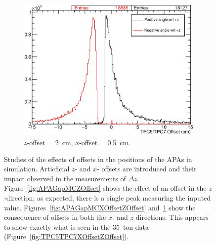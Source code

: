 \begin{figure}
  \hfill
  \begin{subfigure}[t]{0.49\linewidth}
    \centering
    \includegraphics[width=\textwidth]{TPC5TPC7MCXOffsetZOffsetAngle.eps}
    \caption{$z$-offset = 2~cm, $x$-offset = 0.5~cm.}
    \label{fig:APAGapMCXOffsetZOffsetAngle}
  \end{subfigure}
  \caption{Studies of the effects of offsets in the positions of the APAs in simulation.  Articficial $z$- and $x$- offsets are introduced and their impact observed in the measurements of $\Delta z$.  Figure~\ref{fig:APAGapMCZOffset} shows the effect of an offset in the $z$-direction; as expected, there is a single peak measuring the inputed value.  Figures~\ref{fig:APAGapMCXOffsetZOffset} and~\ref{fig:APAGapMCXOffsetZOffsetAngle} show the consequence of offsets in both the $x$- and $z$-directions.  This appears to show exactly what is seen in the 35~ton data (Figure~\ref{fig:TPC5TPC7XOffsetZOffset}).}
  \label{fig:APAGapMC}
\end{figure}

